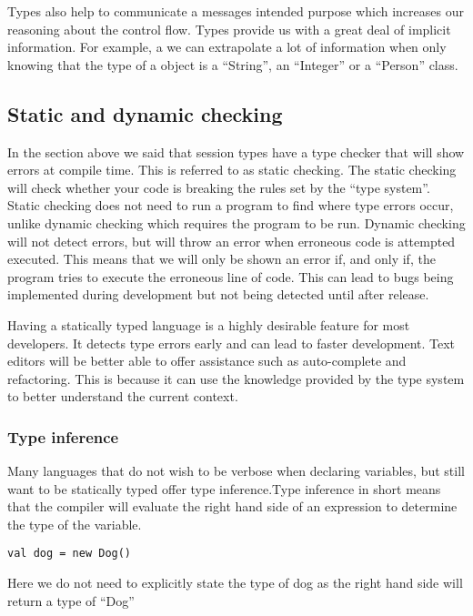 Types also help to communicate a messages intended purpose which increases our reasoning about the control flow. Types provide us with a great deal of implicit information. For example, a we can extrapolate a lot of information when only knowing that the type of a object is a ``String'', an ``Integer'' or a ``Person'' class.

\subsection{Static and dynamic checking}
In the section above we said that session types have a type checker that will show errors at compile time. This is referred to as static checking. The static checking will check whether your code is breaking the rules set by the ``type system''. Static checking does not need to run a program to find where type errors occur,  unlike dynamic checking which requires the program to be run. Dynamic checking will not detect errors, but will throw an error when erroneous code is attempted executed. This means that we will only be shown an error if, and only if, the program tries to execute the erroneous line of code. This can lead to bugs being implemented during development but not being detected until after release. 

Having a statically typed language is a highly desirable feature for most developers. It detects type errors early and can lead to faster development. Text editors will be better able to offer assistance such as auto-complete and refactoring. This is because it can use the knowledge provided by the type system to better understand the current context.

\subsubsection{Type inference}
Many languages that do not wish to be verbose when declaring variables, but still want to be statically typed offer type inference.Type inference in short means that the compiler will evaluate the right hand side of an expression to determine the type of the variable.
\begin{lstlisting}[style=myScalastyle]
val dog = new Dog()
\end{lstlisting}
Here we do not need to explicitly state the type of dog as the right hand side will return a type of ``Dog'' 


